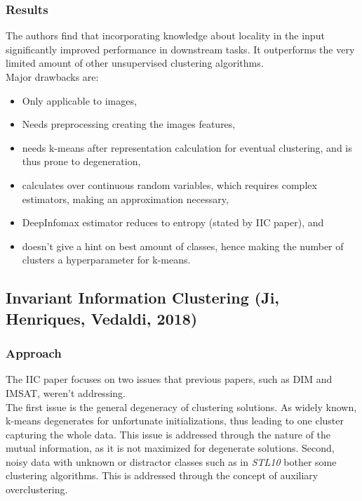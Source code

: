 \documentclass[]{article}
\begin{document}
\subsubsection{Results}
The authors find that incorporating knowledge about locality in the input significantly improved performance in downstream tasks. It outperforms the very limited amount of other unsupervised clustering algorithms.\\

Major drawbacks are:
\begin{itemize}
	\item Only applicable to images,
	\item Needs preprocessing creating the images features,
	\item needs k-means after representation calculation for eventual clustering, and is thus prone to degeneration,
	\item calculates over continuous random variables, which requires complex estimators, making an approximation necessary,
	\item DeepInfomax estimator reduces to entropy (stated by IIC paper), and
	\item doesn't give a hint on best amount of classes, hence making the number of clusters a hyperparameter for k-means.
\end{itemize}

\subsection{Invariant Information Clustering (Ji, Henriques, Vedaldi, 2018)}
\subsubsection{Approach}

The IIC paper focuses on two issues that previous papers, such as DIM and IMSAT, weren't addressing. \\

The first issue is the general degeneracy of clustering solutions. As widely known, k-means degenerates for unfortunate initializations, thus leading to one cluster capturing the whole data. This issue is addressed through the nature of the mutual information, as it is not maximized for degenerate solutions. Second, noisy data with unknown or distractor classes such as in \textit{STL10} bother some clustering algorithms. This is addressed through the concept of auxiliary overclustering.\\
\end{document}
